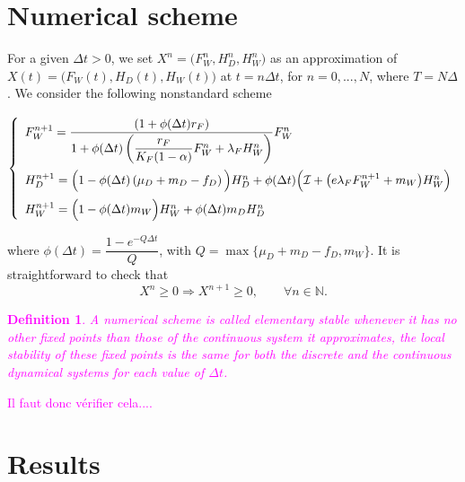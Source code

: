 \documentclass{article}
\newcommand{\cI}{\mathcal{I}}
\newcommand{\YD}[1]{\textcolor{magenta}{#1}}
\newtheorem{definition}{Definition}
\begin{document}
\section{Numerical scheme}
For a given $\Delta t>0$, we set $X^n=\Big(F_W^n,H_D^n,H_W^n \Big)$ as an approximation of $X(t)=\Big(F_W(t),H_D(t),H_W(t)\Big)$ at $t=n\Delta t$, for $n=0,...,N$, where $T=N\Delta$. We consider the following nonstandard scheme

\begin{equation}
\def\arraystretch{2}
\left\{ \begin{array}{l}
F_{W}^{n+1}=\dfrac{\left(1+\phi(\Delta t)r_{F}\right)}{1+\phi(\Delta t)\left(\dfrac{r_{F}}{K_{F}(1-\alpha)}F_{W}^{n}+\lambda_{F}H_{W}^{n}\right)}F_{W}^{n}\\ 
H_{D}^{n+1}=\Big(1-\phi(\Delta t) \left(\mu_{D}+m_{D}-f_{D}\right)\Big)H_{D}^{n}+ \phi(\Delta t)\Big(\cI+ \big(e\lambda_{F}F_{W}^{n+1} + m_{W}\big)H_{W}^{n}\Big)\\ 
H_{W}^{n+1}=\Big(1-\phi(\Delta t)m_{W}\Big)H_{W}^n+\phi(\Delta t)m_{D}H_{D}^n
\end{array}\right.
\end{equation}

where $\phi(\Delta t)=\dfrac{1-e^{-Q\Delta t}}{Q}$, with $Q=\max\{\mu_D+m_D-f_D,m_W\}$. 
It is straightforward to check that
$$
X^n \geq 0 \Rightarrow X^{n+1}\geq 0,\qquad \forall n\in \mathbb{N}.
$$
\YD{
\begin{definition}
A numerical scheme is called elementary stable whenever it has no other fixed points than those of the continuous system it approximates, the local stability of these fixed points is the same for both the discrete and the continuous dynamical systems for each value of $\Delta t$.
\end{definition}
Il faut donc vérifier cela....
}
\section{Results}



\end{document}
